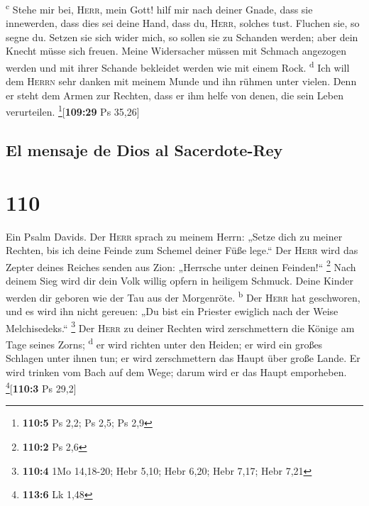 \textsuperscript{c}  Stehe mir bei, \textsc{Herr}, mein
Gott! hilf mir nach deiner Gnade,  dass sie innewerden,
dass dies sei deine Hand, dass du, \textsc{Herr}, solches tust.
 Fluchen sie, so segne du. Setzen sie sich wider mich, so
sollen sie zu Schanden werden; aber dein Knecht müsse sich freuen.
 Meine Widersacher müssen mit Schmach angezogen werden
und mit ihrer Schande bekleidet werden wie mit einem Rock.
\textsuperscript{d}  Ich will dem \textsc{Herrn} sehr
danken mit meinem Munde und ihn rühmen unter vielen. 
Denn er steht dem Armen zur Rechten, dass er ihm helfe von denen, die
sein Leben verurteilen. \footnote{\textbf{110:5} Ps 2,2; Ps 2,5; Ps 2,9}{[}\textbf{109:29}
Ps 35,26{]}

\hypertarget{el-mensaje-de-dios-al-sacerdote-rey}{%
\subsection{El mensaje de Dios al
Sacerdote-Rey}\label{el-mensaje-de-dios-al-sacerdote-rey}}

\hypertarget{section-109}{%
\section{110}\label{section-109}}

 Ein Psalm Davids. Der \textsc{Herr} sprach zu meinem
Herrn: „Setze dich zu meiner Rechten, bis ich deine Feinde zum Schemel
deiner Füße lege.``  Der \textsc{Herr} wird das Zepter
deines Reiches senden aus Zion: „Herrsche unter deinen Feinden!{}``
\footnote{\textbf{110:2} Ps 2,6}  Nach deinem Sieg wird
dir dein Volk willig opfern in heiligem Schmuck. Deine Kinder werden dir
geboren wie der Tau aus der Morgenröte. \textsuperscript{b}
 Der \textsc{Herr} hat geschworen, und es wird ihn nicht
gereuen: „Du bist ein Priester ewiglich nach der Weise Melchisedeks.``
\footnote{\textbf{110:4} 1Mo 14,18-20; Hebr 5,10; Hebr 6,20; Hebr 7,17;
  Hebr 7,21}  Der \textsc{Herr} zu deiner Rechten wird
zerschmettern die Könige am Tage seines Zorns; \textsuperscript{d}
 er wird richten unter den Heiden; er wird ein großes
Schlagen unter ihnen tun; er wird zerschmettern das Haupt über große
Lande.  Er wird trinken vom Bach auf dem Wege; darum wird
er das Haupt emporheben. \footnote{\textbf{113:6} Lk 1,48}{[}\textbf{110:3}
Ps 29,2{]}

